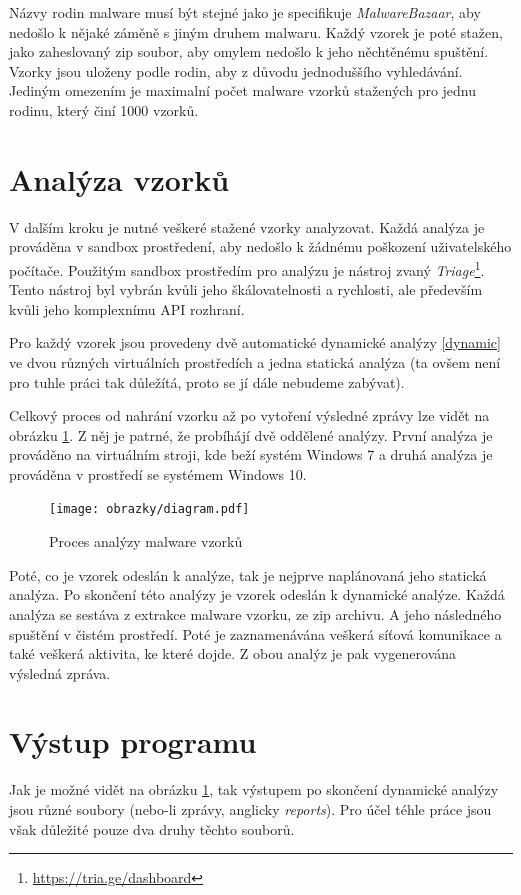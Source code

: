 Názvy rodin malware musí být stejné jako je specifikuje \textit{MalwareBazaar}, aby nedošlo k nějaké záměně s jiným druhem malwaru. Každý vzorek je poté stažen, jako zaheslovaný zip soubor, aby omylem nedošlo k 
jeho něchtěnému spuštění. Vzorky jsou uloženy podle rodin, aby z důvodu jednoduššího vyhledávání. Jediným omezením je maximalní počet malware vzorků stažených pro jednu rodinu, který činí 1000 vzorků.

\section{Analýza vzorků}
V dalším kroku je nutné veškeré stažené vzorky analyzovat. Každá analýza je prováděna v sandbox prostředení, aby nedošlo k žádnému poškození uživatelského počítače.
Použitým sandbox prostředím pro analýzu je nástroj zvaný \textit{Triage}\footnote{\href{https://tria.ge/dashboard}{https://tria.ge/dashboard}}. Tento nástroj byl vybrán kvůli jeho škálovatelnosti a rychlosti, 
ale především kvůli jeho komplexnímu API rozhraní.

Pro každý vzorek jsou provedeny dvě automatické dynamické analýzy \ref{dynamic} ve dvou různých virtuálních prostředích a jedna statická analýza (ta ovšem není pro tuhle práci tak důležítá, proto se jí dále nebudeme zabývat). 

Celkový proces od nahrání vzorku až po vytoření výsledné zprávy lze vidět na obrázku \ref{Analysis_diagram}. Z něj je patrné, že probíhájí dvě oddělené analýzy. První analýza je prováděno na virtuálním stroji, kde beží 
systém Windows 7 a druhá analýza je prováděna v prostředí se systémem Windows 10.

\begin{figure}[h]
	\centering
        \texttt{[image: obrazky/diagram.pdf]}
	\caption{Proces analýzy malware vzorků}
    \label{Analysis_diagram}
\end{figure}

Poté, co je vzorek odeslán k analýze, tak je nejprve naplánovaná jeho statická analýza. Po skončení této analýzy je vzorek odeslán k dynamické analýze. Každá analýza se sestáva z extrakce malware vzorku, ze zip archivu. A jeho následného spuštění v čistém prostředí. Poté je zaznamenávána veškerá síťová komunikace a také veškerá aktivita, ke které dojde.
Z obou analýz je pak vygenerována výsledná zpráva.
\section{Výstup programu}
Jak je možné vidět na obrázku \ref{Analysis_diagram}, tak výstupem po skončení dynamické analýzy jsou různé soubory (nebo-li zprávy, anglicky \textit{reports}). Pro účel téhle práce jsou však důležité pouze dva druhy těchto souborů.

